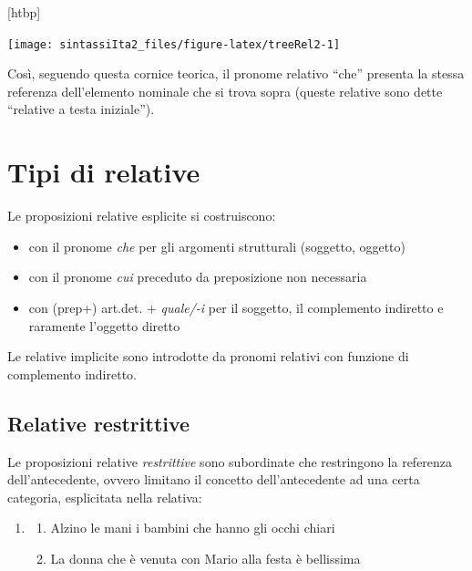 \documentclass[
  a4paper,
  twoside,
  11pt,
  chapterprefix=false,
  bibliography=totocnumbered,
  listof=flat]{scrbook}
\makeatletter
\providecommand{\tightlist}{%
  \setlength{\itemsep}{0pt}\setlength{\parskip}{0pt}}
\def\fps@figure{htbp}
\renewenvironment{figure}[1][\fps@figure]{
  \edef\@tempa{\noexpand\@float{figure}[#1]} 
  \@tempa
  \sffamily
}{
  \end@float
}
\makeatother
\begin{document}
\begin{figure}

{\centering \texttt{[image: sintassiIta2\_files/figure-latex/treeRel2-1]} 

}

\caption{Esempio di costruzione relativa (oggetto)}\label{fig:treeRel2}
\end{figure}

Così, seguendo questa cornice teorica, il pronome relativo \enquote{che} presenta la stessa referenza dell'elemento nominale che si trova sopra (queste relative sono dette \enquote{relative a testa iniziale}).

\hypertarget{tipi-di-relative}{%
\section{Tipi di relative}\label{tipi-di-relative}}

Le proposizioni relative esplicite si costruiscono:

\begin{itemize}
\item
  con il pronome \emph{che} per gli argomenti strutturali (soggetto, oggetto)
\item
  con il pronome \emph{cui} preceduto da preposizione non necessaria
\item
  con (prep+) art.det. + \emph{quale/-i} per il soggetto, il complemento indiretto e raramente l'oggetto diretto
\end{itemize}

Le relative implicite sono introdotte da pronomi relativi con funzione di complemento indiretto.

\hypertarget{relative-restrittive}{%
\subsection{Relative restrittive}\label{relative-restrittive}}

Le proposizioni relative \emph{restrittive} sono subordinate che restringono la referenza dell'antecedente, ovvero limitano il concetto dell'antecedente ad una certa categoria, esplicitata nella relativa:

\begin{enumerate}
\def\labelenumi{(\arabic{enumi})}
\setcounter{enumi}{124}
\item
  \begin{enumerate}
  \def\labelenumii{\alph{enumii}.}
  \tightlist
  \item
    Alzino le mani i bambini che hanno gli occhi chiari
  \item
    La donna che è venuta con Mario alla festa è bellissima
  \end{enumerate}
\end{enumerate}
\end{document}
